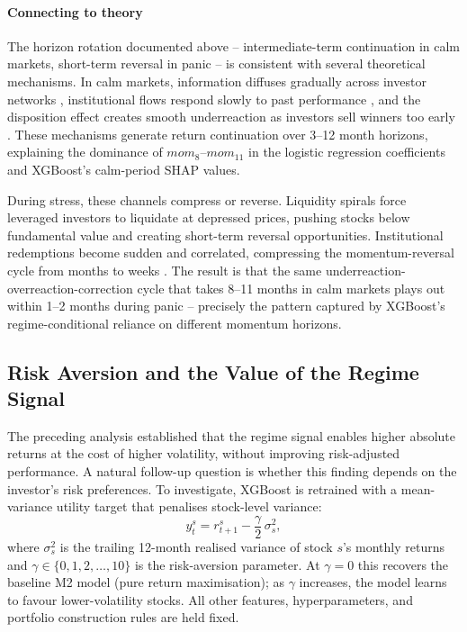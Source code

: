\paragraph{Connecting to theory}
The horizon rotation documented above -- intermediate-term continuation in calm markets, short-term reversal in panic -- is consistent with several theoretical mechanisms. In calm markets, information diffuses gradually across investor networks \citep{Hong1999}, institutional flows respond slowly to past performance \citep{VayanosWoolley2013}, and the disposition effect creates smooth underreaction as investors sell winners too early \citep{GrinblattHan2005}. These mechanisms generate return continuation over 3--12 month horizons, explaining the dominance of $mom_{8}$--$mom_{11}$ in the logistic regression coefficients and XGBoost's calm-period SHAP values.

During stress, these channels compress or reverse. Liquidity spirals \citep{BrunnermeierPedersen2009} force leveraged investors to liquidate at depressed prices, pushing stocks below fundamental value and creating short-term reversal opportunities. Institutional redemptions become sudden and correlated, compressing the momentum-reversal cycle from months to weeks \citep{VayanosWoolley2013}. The result is that the same underreaction-overreaction-correction cycle that takes 8--11 months in calm markets plays out within 1--2 months during panic -- precisely the pattern captured by XGBoost's regime-conditional reliance on different momentum horizons.

\subsection{Risk Aversion and the Value of the Regime Signal}\label{sec:risk_aversion}

The preceding analysis established that the regime signal enables higher absolute returns at the cost of higher volatility, without improving risk-adjusted performance. A natural follow-up question is whether this finding depends on the investor's risk preferences. To investigate, XGBoost is retrained with a mean-variance utility target \citep{Markowitz1952} that penalises stock-level variance:
\begin{equation}
    y_t^s = r_{t+1}^s - \frac{\gamma}{2}\,\sigma_s^2,
\end{equation}
where $\sigma_s^2$ is the trailing 12-month realised variance of stock $s$'s monthly returns and $\gamma \in \{0, 1, 2, \dots, 10\}$ is the risk-aversion parameter. At $\gamma = 0$ this recovers the baseline M2 model (pure return maximisation); as $\gamma$ increases, the model learns to favour lower-volatility stocks. All other features, hyperparameters, and portfolio construction rules are held fixed.

